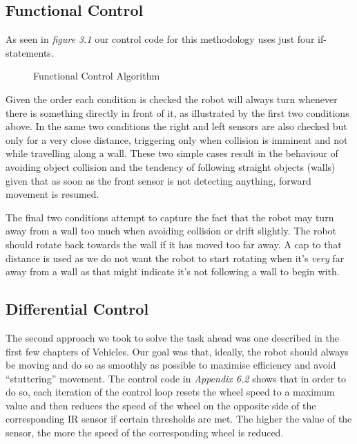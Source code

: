 \documentclass[paper=a4, fontsize=12pt]{scrartcl}	%
\numberwithin{equation}{section}		%
\numberwithin{figure}{section}			%
\numberwithin{table}{section}				%
\begin{document}
\subsection{Functional Control}
As seen in \emph{figure 3.1} our control code for this methodology uses just four if-statements.

\begin{figure}[!ht]
\begin{framed}
\begin{algorithmic}
 \ENDIF
 \ENDIF
 \ENDIF
 \ENDIF
\end{algorithmic}
\end{framed}
\caption{Functional Control Algorithm}
\end{figure}

Given the order each condition is checked the robot will always turn whenever there is something directly in front of it, as illustrated by the first two conditions above. In the same two conditions the right and left sensors are also checked but only for a very close distance, triggering only when collision is imminent and not while travelling along a wall. These two simple cases result in the behaviour of avoiding object collision and the tendency of following straight objects (walls) given that as soon as the front sensor is not detecting anything, forward movement is resumed.

The final two conditions attempt to capture the fact that the robot may turn away from a wall too much when avoiding collision or drift slightly. The robot should rotate back towards the wall if it has moved too far away. A cap to that distance is used as we do not want the robot to start rotating when it's \emph{very} far away from a wall as that might indicate it's not following a wall to begin with.
\subsection{Differential Control}
The second approach we took to solve the task ahead was one described in the first few chapters of Vehicles\cite[p.6-9]{vehicles}. Our goal was that, ideally, the robot should always be moving and do so as smoothly as possible to maximise efficiency and avoid ``stuttering'' movement. The control code in \emph{Appendix 6.2} shows that in order to do so, each iteration of the control loop resets the wheel speed to a maximum value and then reduces the speed of the wheel on the opposite side of the corresponding IR sensor if certain thresholds are met. The higher the value of the sensor, the more the speed of the corresponding wheel is reduced.
\end{document}
